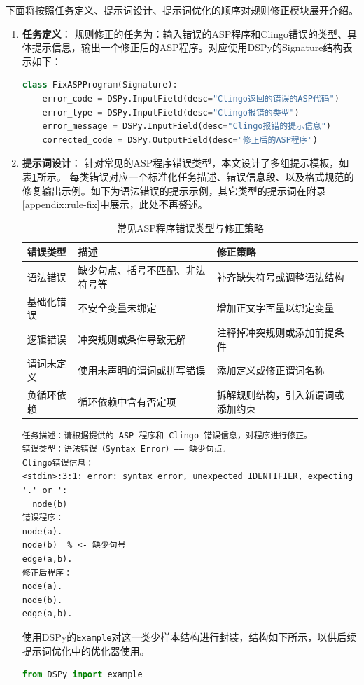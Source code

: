 下面将按照任务定义、提示词设计、提示词优化的顺序对规则修正模块展开介绍。
\begin{enumerate}[nosep]
\item \textbf{任务定义}：
规则修正的任务为：输入错误的ASP程序和Clingo错误的类型、具体提示信息，输出一个修正后的ASP程序。对应使用DSPy的Signature结构表示如下：
\begin{lstlisting}[language=python]
class FixASPProgram(Signature):
    error_code = DSPy.InputField(desc="Clingo返回的错误的ASP代码")
    error_type = DSPy.InputField(desc="Clingo报错的类型")
    error_message = DSPy.InputField(desc="Clingo报错的提示信息")
    corrected_code = DSPy.OutputField(desc="修正后的ASP程序")
\end{lstlisting}
\item \textbf{提示词设计}：
针对常见的ASP程序错误类型，本文设计了多组提示模板，如表\ref{tab:asp-fix-templates}所示。
每类错误对应一个标准化任务描述、错误信息段、以及格式规范的修复输出示例。如下为语法错误的提示示例，其它类型的提示词在附录\ref{appendix:rule-fix}中展示，此处不再赘述。
\begin{table}[H]
\centering
\caption{常见ASP程序错误类型与修正策略}
\begin{tabular}{|l|p{5.5cm}|p{5.5cm}|}
\hline
\textbf{错误类型} & \textbf{描述} & \textbf{修正策略} \\
\hline
语法错误 & 缺少句点、括号不匹配、非法符号等 & 补齐缺失符号或调整语法结构 \\
\hline
基础化错误 & 不安全变量未绑定 & 增加正文字面量以绑定变量 \\
\hline
逻辑错误 & 冲突规则或条件导致无解 & 注释掉冲突规则或添加前提条件 \\
\hline
谓词未定义 & 使用未声明的谓词或拼写错误 & 添加定义或修正谓词名称 \\
\hline
负循环依赖 & 循环依赖中含有否定项 & 拆解规则结构，引入新谓词或添加约束 \\
\hline
\end{tabular}
\label{tab:asp-fix-templates}
\end{table}
\begin{lstlisting}
任务描述：请根据提供的 ASP 程序和 Clingo 错误信息，对程序进行修正。
错误类型：语法错误（Syntax Error）—— 缺少句点。
Clingo错误信息：
<stdin>:3:1: error: syntax error, unexpected IDENTIFIER, expecting '.' or ':
  node(b)
错误程序：
node(a).
node(b)  % <- 缺少句号
edge(a,b).
修正后程序：
node(a).
node(b).
edge(a,b).
\end{lstlisting}
使用DSPy的\texttt{Example}对这一类少样本结构进行封装，结构如下所示，以供后续提示词优化中的优化器使用。
\begin{lstlisting}[language=python]
from DSPy import example


\end{lstlisting}
\end{enumerate}
